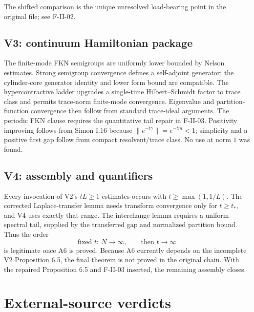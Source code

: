 \documentclass[11pt,a4paper]{article}
\begin{document}
The shifted comparison is the unique unresolved load-bearing point in the original file;
see F-II-02.

\subsection{V3: continuum Hamiltonian package}

The finite-mode FKN semigroups are uniformly lower bounded by Nelson estimates.  Strong
semigroup convergence defines a self-adjoint generator; the cylinder-core generator
identity and lower form bound are compatible.  The hypercontractive ladder upgrades a
single-time Hilbert--Schmidt factor to trace class and permits trace-norm finite-mode
convergence.  Eigenvalue and partition-function convergence then follow from standard
trace-ideal arguments.  The periodic FKN clause requires the quantitative tail repair in
F-II-03.  Positivity improving follows from Simon I.16 because
$\|e^{-t\gamma}\|=e^{-tm}<1$; simplicity and a positive first gap follow from compact
resolvent/trace class.  No use at norm $1$ was found.

\subsection{V4: assembly and quantifiers}

Every invocation of V2's $tL\ge1$ estimates occurs with
$t\ge\max(1,1/L)$.  The corrected Laplace-transfer lemma needs transform convergence
only for $t\ge t_*$, and V4 uses exactly that range.  The interchange lemma requires a
uniform spectral tail, supplied by the transferred gap and normalized partition bound.
Thus the order
\[
 \text{fixed }t:\ N\to\infty,\qquad\text{then }t\to\infty
\]
is legitimate once A6 is proved.  Because A6 currently depends on the incomplete V2
Proposition 6.5, the final theorem is not proved in the original chain.  With the repaired
Proposition 6.5 and F-II-03 inserted, the remaining assembly closes.

\section{External-source verdicts}
\end{document}
